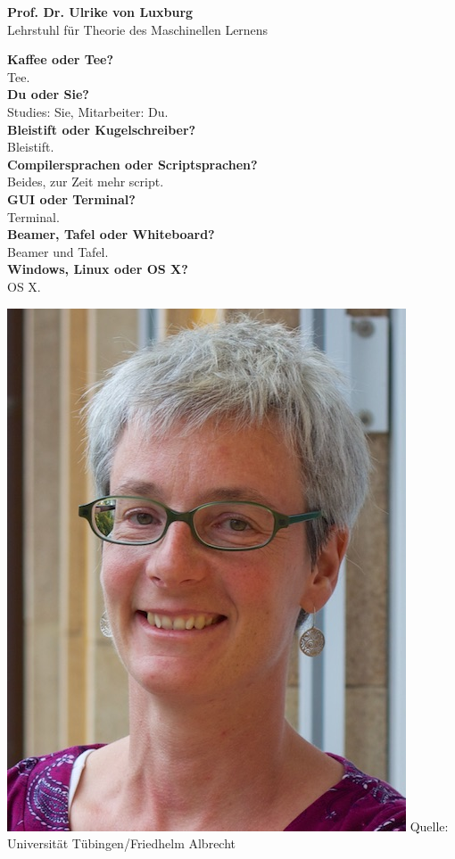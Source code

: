 \large \textbf{Prof. Dr. Ulrike von Luxburg}\\
\normalsize Lehrstuhl für Theorie des Maschinellen Lernens\\
\normalsize

\begin{minipage}[h]{0.65\textwidth}
	\textbf{Kaffee oder Tee?}\\
	Tee.\\
	\textbf{Du oder Sie?}\\
	Studies: Sie, Mitarbeiter: Du.
	\\
	\textbf{Bleistift oder Kugelschreiber?}\\
	Bleistift.
	\\
	\textbf{Compilersprachen oder Scriptsprachen?}\\
	Beides, zur Zeit mehr script.
	\\
	\textbf{GUI oder Terminal?}\\
	Terminal.
	\\
	\textbf{Beamer, Tafel oder Whiteboard?}\\
	Beamer und Tafel.
	\\
	\textbf{Windows, Linux oder OS X?}\\
	OS X.
	\\
\end{minipage}
\begin{minipage}[h]{0.35\textwidth}
	\vspace{0.5cm}
	\includegraphics[width=\textwidth]{content/pictures/luxburg.jpg}
	Quelle: Universität Tübingen/Friedhelm Albrecht
\end{minipage}

